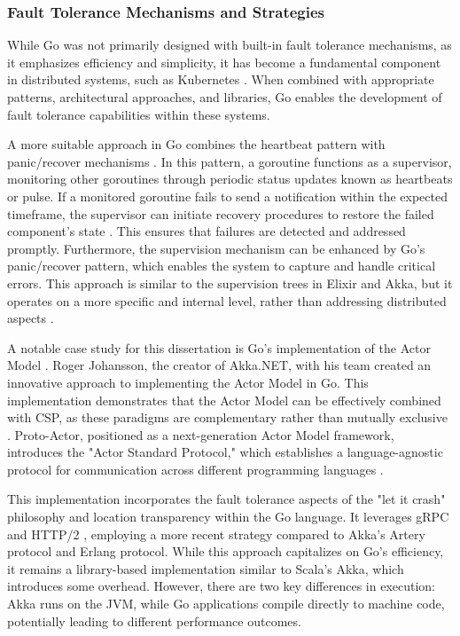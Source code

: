 \subsubsection{Fault Tolerance Mechanisms and Strategies}

While Go was not primarily designed with built-in fault tolerance mechanisms, as it emphasizes efficiency and simplicity, it has become a fundamental component in distributed systems, such as Kubernetes \cite{Castro2019, Kennedy2016}. When combined with appropriate patterns, architectural approaches, and libraries, Go enables the development of fault tolerance capabilities within these systems.

A more suitable approach in Go combines the heartbeat pattern with panic/recover mechanisms \cite{Cox-Buday2017}. In this pattern, a goroutine functions as a supervisor, monitoring other goroutines through periodic status updates known as heartbeats or pulse. If a monitored goroutine fails to send a notification within the expected timeframe, the supervisor can initiate recovery procedures to restore the failed component's state \cite{Cox-Buday2017, go-docs}. This ensures that failures are detected and addressed promptly. Furthermore, the supervision mechanism can be enhanced by Go's panic/recover pattern, which enables the system to capture and handle critical errors. This approach is similar to the supervision trees in Elixir and Akka, but it operates on a more specific and internal level, rather than addressing distributed aspects \cite{go-docs}.

A notable case study for this dissertation is Go's implementation of the Actor Model \cite{Whitney2019}. Roger Johansson, the creator of Akka.NET, with his team created an innovative approach to implementing the Actor Model in Go. This implementation demonstrates that the Actor Model can be effectively combined with \gls{CSP}, as these paradigms are complementary rather than mutually exclusive \cite{proto-actor-docs}. Proto-Actor, positioned as a next-generation Actor Model framework, introduces the "Actor Standard Protocol," which establishes a language-agnostic protocol for communication across different programming languages \cite{proto-actor-docs}. 

This implementation incorporates the fault tolerance aspects of the "let it crash" philosophy and location transparency \cite{proto-actor-docs} within the Go language. It leverages gRPC and HTTP/2 \cite{proto-actor-docs}, employing a more recent strategy compared to Akka’s Artery protocol and Erlang protocol. While this approach capitalizes on Go's efficiency, it remains a library-based implementation similar to Scala's Akka, which introduces some overhead. However, there are two key differences in execution: Akka runs on the JVM, while Go applications compile directly to machine code, potentially leading to different performance outcomes.

